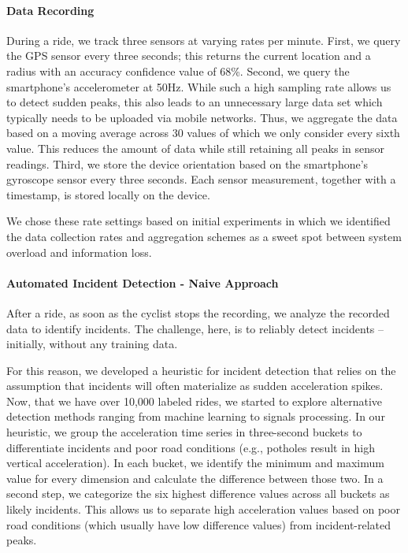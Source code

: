 \paragraph{Data Recording}
During a ride, we track three sensors at varying rates per minute.
First, we query the GPS sensor every three seconds; this returns the current location and a radius with an accuracy confidence value of 68\%.
Second, we query the smartphone's accelerometer at 50Hz.
While such a high sampling rate allows us to detect sudden peaks, this also leads to an unnecessary large data set which typically needs to be uploaded via mobile networks.
Thus, we aggregate the data based on a moving average across 30 values of which we only consider every sixth value.
This reduces the amount of data while still retaining all peaks in sensor readings.
Third, we store the device orientation based on the smartphone's gyroscope sensor every three seconds.
Each sensor measurement, together with a timestamp, is stored locally on the device.

We chose these rate settings based on initial experiments in which we identified the data collection rates and aggregation schemes as a sweet spot between system overload and information loss.



\paragraph{Automated Incident Detection - Naive Approach}
After a ride, as soon as the cyclist stops the recording, we analyze the recorded data to identify incidents.
The challenge, here, is to reliably detect incidents -- initially, without any training data.

For this reason, we developed a heuristic for incident detection that relies on the assumption that incidents will often materialize as sudden acceleration spikes.
Now, that we have over 10,000 labeled rides, we started to explore alternative detection methods ranging from machine learning to signals processing.
In our heuristic, we group the acceleration time series in three-second buckets to differentiate incidents and poor road conditions (e.g., potholes result in high vertical acceleration).
In each bucket, we identify the minimum and maximum value for every dimension and calculate the difference between those two.
In a second step, we categorize the six highest difference values across all buckets as likely incidents.
This allows us to separate high acceleration values based on poor road conditions (which usually have low difference values) from incident-related peaks.

